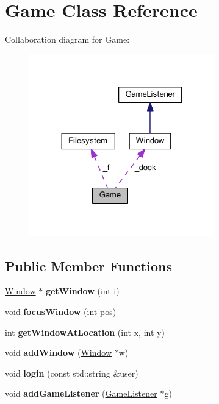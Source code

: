 \hypertarget{class_game}{}\section{Game Class Reference}
\label{class_game}


Collaboration diagram for Game\+:\nopagebreak
\begin{figure}[H]
\begin{center}
\leavevmode
\includegraphics[width=227pt]{class_game__coll__graph}
\end{center}
\end{figure}
\subsection*{Public Member Functions}
\begin{DoxyCompactItemize}
\item 
\hypertarget{class_game_a50cc765d80923a84ffc1f27eb6f3131b}{}\label{class_game_a50cc765d80923a84ffc1f27eb6f3131b} 
\hyperlink{class_window}{Window} $\ast$ {\bfseries get\+Window} (int i)
\item 
\hypertarget{class_game_a239067e33c0bc2a13556835a3b256d97}{}\label{class_game_a239067e33c0bc2a13556835a3b256d97} 
void {\bfseries focus\+Window} (int pos)
\item 
\hypertarget{class_game_a95b3e1391bebb6e364eba411cc9dbe17}{}\label{class_game_a95b3e1391bebb6e364eba411cc9dbe17} 
int {\bfseries get\+Window\+At\+Location} (int x, int y)
\item 
\hypertarget{class_game_a887a40c61bff9edff550bdd26cc96448}{}\label{class_game_a887a40c61bff9edff550bdd26cc96448} 
void {\bfseries add\+Window} (\hyperlink{class_window}{Window} $\ast$w)
\item 
\hypertarget{class_game_ad41f2e79cf1b47b8bbf8837c7757fcce}{}\label{class_game_ad41f2e79cf1b47b8bbf8837c7757fcce} 
void {\bfseries login} (const std\+::string \&user)
\item 
\hypertarget{class_game_a8dbcab05b5640a882abf5bc2038462ca}{}\label{class_game_a8dbcab05b5640a882abf5bc2038462ca} 
void {\bfseries add\+Game\+Listener} (\hyperlink{class_game_listener}{Game\+Listener} $\ast$g)
\end{DoxyCompactItemize}
